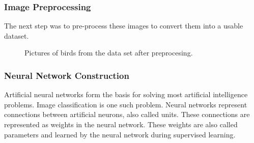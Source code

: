 \documentclass[11pt]{article}
\begin{document}
  \subsubsection{Image Preprocessing}
  The next step was to pre-process these images to convert them into a
  usable dataset. 

 \begin{center}
    \begin{figure}[h!]
    \centering
    \qquad
    \qquad

   \caption{Pictures of birds from the data set after preprocesing.}%
   \label{fig:birds}
    \end{figure}
  \end{center}

  \subsubsection{Neural Network Construction}
  Artificial neural networks form the basis for solving most artificial intelligence 
  problems. Image classification is one such problem. Neural networks represent connections 
  between artificial neurons, also called units. These connections are represented as weights 
  in the neural network. These weights are also called parameters and 
  learned by the neural network during supervised learning.
\end{document}
